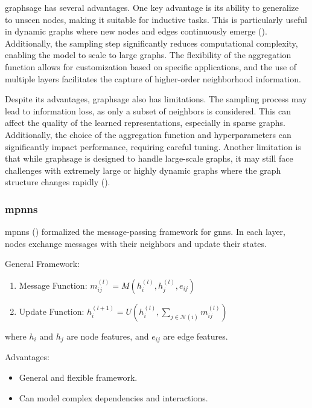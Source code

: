 \gls{graphsage} has several advantages.
One key advantage is its ability to generalize to unseen nodes, making it suitable for inductive tasks.
This is particularly useful in dynamic graphs where new nodes and edges continuously emerge (\cite{Hamilton2017}).
Additionally, the sampling step significantly reduces computational complexity, enabling the model to scale to large graphs.
The flexibility of the aggregation function allows for customization based on specific applications, and the use of multiple layers facilitates the capture of higher-order neighborhood information.

Despite its advantages, \gls{graphsage} also has limitations.
The sampling process may lead to information loss, as only a subset of neighbors is considered.
This can affect the quality of the learned representations, especially in sparse graphs.
Additionally, the choice of the aggregation function and hyperparameters can significantly impact performance, requiring careful tuning.
Another limitation is that while \gls{graphsage} is designed to handle large-scale graphs, it may still face challenges with extremely large or highly dynamic graphs where the graph structure changes rapidly (\cite{Wu2021}).

\subsubsection*{\glspl{mpnn}}

\glspl{mpnn} (\cite{Gilmer2017}) formalized the message-passing framework for \glspl{gnn}. In each layer, nodes exchange messages with their neighbors and update their states.

General Framework:

\begin{enumerate}
    \item Message Function: \( m_{ij}^{(l)} = M(h_i^{(l)}, h_j^{(l)}, e_{ij}) \)
    \item Update Function: \( h_i^{(l+1)} = U\left(h_i^{(l)}, \sum_{j \in \mathcal{N}(i)} m_{ij}^{(l)}\right) \)
\end{enumerate}

where \( h_i \) and \( h_j \) are node features, and \( e_{ij} \) are edge features.

Advantages:
\begin{itemize}
    \item General and flexible framework.
    \item Can model complex dependencies and interactions.
\end{itemize}


